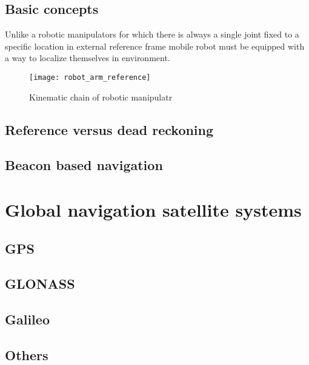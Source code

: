 \subsection{Basic concepts}
Unlike a robotic manipulators for which there is always a single joint fixed to a specific
location in external reference frame mobile robot must be equipped with a way to localize
themselves in environment.
\begin{figure}[hb]
	\texttt{[image: robot\_arm\_reference]}
	\caption{Kinematic chain of robotic manipulatr}
	\label{fig:robot_arm_reference}
\end{figure}


\subsection{Reference versus dead reckoning}

\subsection{Beacon based navigation}


\section{Global navigation satellite systems}

\subsection{GPS}

\subsection{GLONASS}

\subsection{Galileo}

\subsection{Others}




